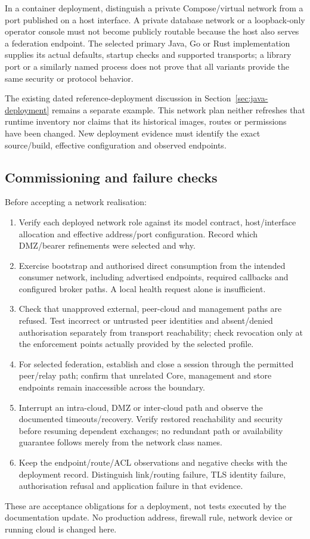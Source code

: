 In a container deployment, distinguish a private Compose/virtual network from a port published on a host interface. A private database network or a loopback-only operator console must not become publicly routable because the host also serves a federation endpoint. The selected primary Java, Go or Rust implementation supplies its actual defaults, startup checks and supported transports; a library port or a similarly named process does not prove that all variants provide the same security or protocol behavior.

The existing dated reference-deployment discussion in Section~\ref{sec:java-deployment} remains a separate example. This network plan neither refreshes that runtime inventory nor claims that its historical images, routes or permissions have been changed. New deployment evidence must identify the exact source/build, effective configuration and observed endpoints.

\subsection{Commissioning and failure checks}
Before accepting a network realisation:
\begin{enumerate}
\item Verify each deployed network role against its model contract, host/interface allocation and effective address/port configuration. Record which DMZ/bearer refinements were selected and why.
\item Exercise bootstrap and authorised direct consumption from the intended consumer network, including advertised endpoints, required callbacks and configured broker paths. A local health request alone is insufficient.
\item Check that unapproved external, peer-cloud and management paths are refused. Test incorrect or untrusted peer identities and absent/denied authorisation separately from transport reachability; check revocation only at the enforcement points actually provided by the selected profile.
\item For selected federation, establish and close a session through the permitted peer/relay path; confirm that unrelated Core, management and store endpoints remain inaccessible across the boundary.
\item Interrupt an intra-cloud, DMZ or inter-cloud path and observe the documented timeouts/recovery. Verify restored reachability and security before resuming dependent exchanges; no redundant path or availability guarantee follows merely from the network class names.
\item Keep the endpoint/route/ACL observations and negative checks with the deployment record. Distinguish link/routing failure, TLS identity failure, authorisation refusal and application failure in that evidence.
\end{enumerate}
These are acceptance obligations for a deployment, not tests executed by the documentation update. No production address, firewall rule, network device or running cloud is changed here.
